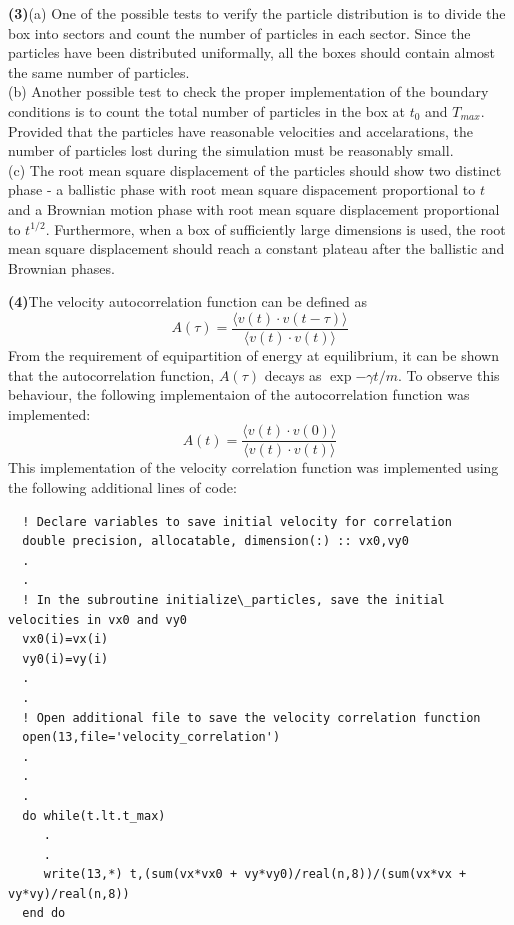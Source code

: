 \documentclass[11pt, oneside]{article}
\begin{document}
\textbf{(3)}\quad (a) One of the possible tests to verify the particle distribution is to divide the box into sectors and count the number of particles in each sector. Since the particles have been distributed uniformally, all the boxes should contain almost the same number of particles.\\
(b) Another possible test to check the proper implementation of the boundary conditions is to count the total number of particles in the box at \(t_0\) and \(T_{max}\). Provided that the particles have reasonable velocities and accelarations, the number of particles lost during the simulation must be reasonably small.\\ (c) The root mean square displacement of the particles should show two distinct phase - a ballistic phase with root mean square dispacement proportional to \(t\) and a Brownian motion phase with root mean square displacement proportional to \(t^{1/2}\). Furthermore, when a box of sufficiently large dimensions is used, the root mean square displacement should reach a constant plateau after the ballistic and Brownian phases.     

\textbf{(4)}\quad The velocity autocorrelation function can be defined as
\[A(\tau) = \frac{\langle v(t) \cdot v(t-\tau) \rangle}{\langle v(t) \cdot v(t) \rangle}\]
  From the requirement of equipartition of energy at equilibrium, it can be shown that the autocorrelation function, \(A(\tau)\) decays as \(\exp{-\gamma t / m}\). To observe this behaviour, the following implementaion of the autocorrelation function was implemented: \[A(t) = \frac{\langle v(t) \cdot v(0) \rangle}{\langle v(t) \cdot v(t) \rangle}\] This implementation of the velocity correlation function was implemented using the following additional lines of code:

\begin{lstlisting}
  ! Declare variables to save initial velocity for correlation
  double precision, allocatable, dimension(:) :: vx0,vy0
  .
  .
  ! In the subroutine initialize\_particles, save the initial velocities in vx0 and vy0
  vx0(i)=vx(i)
  vy0(i)=vy(i)
  .
  .
  ! Open additional file to save the velocity correlation function
  open(13,file='velocity_correlation')
  .
  .
  .
  do while(t.lt.t_max)
     .
     .
     write(13,*) t,(sum(vx*vx0 + vy*vy0)/real(n,8))/(sum(vx*vx + vy*vy)/real(n,8))
  end do
\end{lstlisting}     
\end{document}
